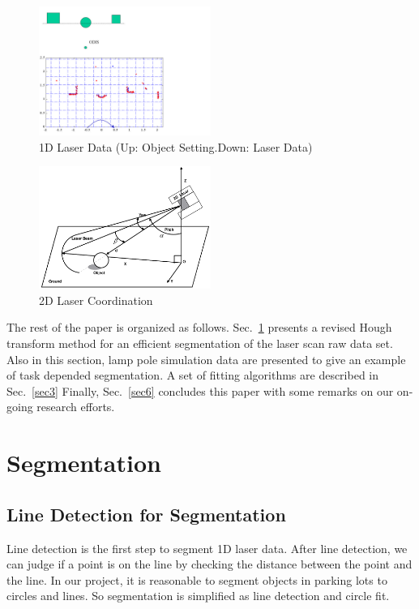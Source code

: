 \documentclass{cdcarta4}
\begin{document}
\begin{figure}[!htb]
    \center\includegraphics[width=0.5\textwidth]{img/1Dlaser}
    \caption{1D Laser Data (Up: Object Setting.Down: Laser Data)}\label{fig:1dlaser}
\end{figure}

\begin{figure}[!htb]
    \center\includegraphics[width=0.5\textwidth]{img/2Dlaser}
    \caption{2D Laser Coordination }\label{fig:2dlaser}
\end{figure}



The rest of the paper is organized as follows. 
Sec.~\ref{sec2} presents a revised Hough transform method
for an efficient segmentation of the laser scan raw data set.
Also in this section, lamp pole simulation data are presented to give
an example of task depended segmentation.
A set of fitting algorithms are described in Sec.~\ref{sec3}
%
Finally, Sec.~\ref{sec6} concludes this paper with some remarks on our on-going research efforts.


 

\section{Segmentation}
\label{sec2}
    \subsection{Line Detection for Segmentation}
Line detection is the first step to segment 1D laser data. After line detection, we can judge if a point is on the line by checking the distance between the point and the line. In our project, it is reasonable to segment objects in parking lots to circles and lines. So segmentation is simplified as line detection and circle fit. 
\end{document}
